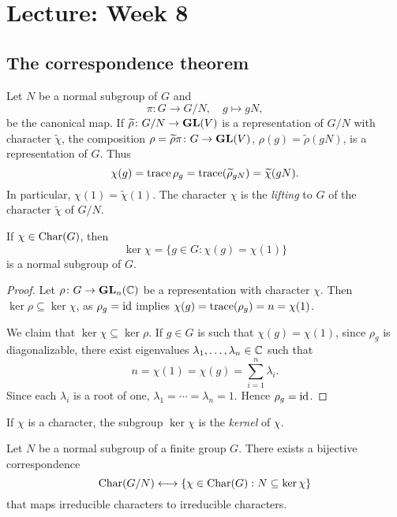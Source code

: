 \section{Lecture: Week 8}

\subsection{The correspondence theorem}

Let $N$ be a normal subgroup of $G$ 
and 
\[
\pi\colon G\to G/N,\quad 
g\mapsto gN,
\]
be the canonical map. 
If $\widetilde{\rho}\colon G/N\to\mathbf{GL}(V)$ 
is a representation of $G/N$ with 
character
$\widetilde{\chi}$, the composition 
$\rho=\widetilde{\rho}\pi\colon G\to \mathbf{GL}(V)$, $\rho(g)=\widetilde{\rho}(gN)$, 
is a representation of $G$. 
Thus
\[
\chi(g)=\operatorname{trace}{\rho_g}=\operatorname{trace}(\widetilde{\rho}_{gN})=\widetilde{\chi}(gN).
\]
In particular, $\chi(1)=\widetilde{\chi}(1)$. The character $\chi$ 
is the \emph{lifting} to $G$ of the character 
$\widetilde{\chi}$ of $G/N$. 

\begin{proposition}
If $\chi\in\operatorname{Char}(G)$, then 
\[
\ker\chi=\{g\in G:\chi(g)=\chi(1)\}
\]
is a normal subgroup of $G$. 
\end{proposition}

\begin{proof}
Let $\rho\colon G\to\mathbf{GL}_n(\mathbb{C})$ be a representation with character $\chi$. Then 
$\ker\rho\subseteq\ker\chi$, as $\rho_g=\operatorname{id}$ implies 
$\chi(g)=\operatorname{trace}(\rho_g)=n=\chi(1)$. 

We claim that  
$\ker\chi\subseteq\ker\rho$. If $g\in G$ is such that $\chi(g)=\chi(1)$, since 
$\rho_g$ is diagonalizable, there exist eigenvalues $\lambda_1,\dots,\lambda_n\in\mathbb{C}$ such that
\[
n=\chi(1)=\chi(g)=\sum_{i=1}^n\lambda_i.
\]
Since each $\lambda_i$ is a root of one,  
$\lambda_1=\cdots=\lambda_n=1$. Hence $\rho_g=\operatorname{id}$. 
\end{proof}

If $\chi$ is a character, the subgroup $\ker\chi$ 
is the \emph{kernel} of $\chi$. 

\begin{theorem}
\label{thm:correspondence}
Let $N$ be a normal subgroup of a finite group $G$. There exists
a bijective correspondence 
\[
\operatorname{Char}(G/N) \longleftrightarrow \{\chi\in\operatorname{Char}(G): 
N\subseteq\ker\chi\}
\]
that maps irreducible characters to irreducible characters.
\end{theorem}

